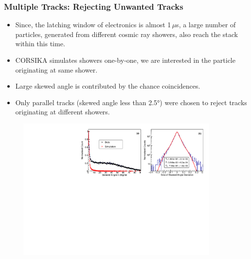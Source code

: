\documentclass{beamer}
\begin{document}
\begin{frame}
  \frametitle{Multiple Tracks: Rejecting Unwanted Tracks}
  \vspace{-6pt}
  \begin{itemize} %
  \item Since, the latching window of electronics is almost 1\,$\mu$s,
    a large number of particles, generated from different cosmic ray
    showers, also reach the stack within this time.
  \item CORSIKA simulates showers one-by-one, we are interested in
    the particle originating at same shower.
  \item Large skewed angle is contributed by the chance coincidences.
  \item Only parallel tracks (skewed angle less than \ang{2.5;;})
    were chosen to reject tracks originating at different showers.
  \end{itemize}
  \begin{figure}[!h]
    \includegraphics[width=0.9\textwidth]{skewed_compare_reso_2plot_full.pdf}
  \end{figure}
\end{frame}
\end{document}
